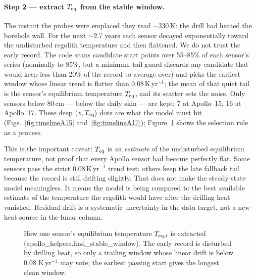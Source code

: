 \documentclass[11pt]{report}
\newcommand{\code}[1]{{\ttfamily\small #1}}
\begin{document}
\paragraph{\textbf{Step 2 --- extract $T_{\rm eq}$ from the stable window.}}
The instant the probes were emplaced they read $\sim$330\,K: the drill had heated
the borehole wall. For the next $\sim$2.7 years each sensor decayed exponentially
toward the undisturbed regolith temperature and then flattened. We do not trust
the early record. The code scans candidate start points over 55--85\% of each
sensor's series (nominally to 85\%, but a minimum-tail guard discards any
candidate that would keep less than 20\% of the record to average over)
and picks the earliest window whose linear trend is flatter than
$0.08$\,K\,yr$^{-1}$; the mean of that quiet tail is the sensor's equilibrium
temperature $T_{\rm eq}$, and its scatter sets the noise. Only sensors below
80\,cm --- below the daily skin --- are kept: 7 at Apollo~15, 16 at Apollo~17.
These deep $(z,T_{\rm eq})$ dots are what the model must hit
(Figs.~\ref{fig:timelineA15} and~\ref{fig:timelineA17}); Figure~\ref{fig:windowflow} shows the selection
rule as a process.

\begin{plain}
This is the important caveat: $T_{\rm eq}$ is an \emph{estimate} of the
undisturbed equilibrium temperature, not proof that every Apollo sensor had
become perfectly flat. Some sensors pass the strict $0.08$\,K\,yr$^{-1}$ trend
test; others keep the late fallback tail because the record is still drifting
slightly. That does not make the steady-state model meaningless. It means the
model is being compared to the best available estimate of the temperature the
regolith would have after the drilling heat vanished. Residual drift is a
systematic uncertainty in the data target, not a new heat source in the lunar
column.
\end{plain}

\begin{figure}[htbp]\centering

\caption{How one sensor's equilibrium temperature $T_{{\rm eq},i}$ is
extracted (\code{apollo\_helpers.find\_stable\_window}). The early record is
disturbed by drilling heat, so only a trailing window whose linear drift is
below $0.08$ K\,yr$^{-1}$ may vote; the earliest passing start gives the
longest clean window.}
\label{fig:windowflow}
\end{figure}
\end{document}
